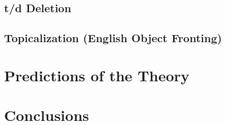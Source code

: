 \subsection{t/d Deletion}

\subsection{Topicalization (English Object Fronting)}
\label{topsect}

\section{Predictions of the Theory}

\section{Conclusions}










%
%


